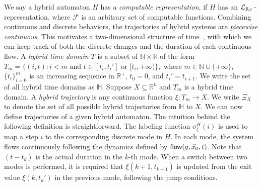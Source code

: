 We say a hybrid automaton $H$ has a {\em computable representation}, if $H$ has
an $\mathcal{L}_{\mathbb{R}_{\mathcal{F}}}$-representation, where $\mathcal{F}$ is an arbitrary set of computable
functions.
Combining continuous and discrete behaviors, the trajectories of hybrid systems are {\em piecewise continuous}. This motivates a two-dimensional structure of time~\citep{?}, with which we can keep track of both the discrete changes and the duration of each continuous flow.
A {\em hybrid time domain} $T$ is a subset of $\mathbb{N}\times \mathbb{R}$ of the form
$T_m=\{(i, t): i<m \mbox{ and } t\in [t_i, t_i']\mbox{ or }[t_i, +\infty)\},$
where $m\in \mathbb{N}\cup\{+\infty\}$, $\{t_i\}_{i=0}^m$ is an increasing sequence in $\mathbb{R}^+$, $t_0= 0$, and $t_i'=t_{i+1}$.
We write the set of all hybrid time domains as $\mathbb{H}$.
Suppose $X\subseteq\mathbb{R}^n$ and $T_m$ is a hybrid time domain. A {\em hybrid trajectory} is any continuous function $\xi: T_m\rightarrow X.$
We write $\Xi_X$ to denote the set of all possible hybrid trajectories from $\mathbb{H}$ to $X$.
We can now define trajectories of a given hybrid automaton. The intuition behind the following definition is straightforward. The labeling function $\sigma_{\xi}^H(i)$ is used to map a step $i$ to the corresponding discrete mode in $H$. In each mode, the system flows continuously following the dynamics defined by $\mathsf{flow}(q, \vec x_0, t)$. Note that $(t-t_k)$ is the actual duration in the $k$-th mode. When a switch between two modes is performed, it is required
that $\xi(k+1, t_{k+1})$ is updated from the exit value $\xi(k, t_k')$ in the previous mode, following the jump conditions.

